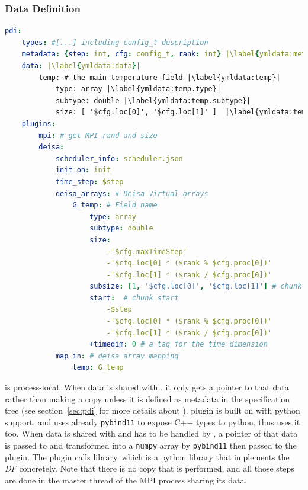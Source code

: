 \subsubsection{Data Definition}\label{sec:datamodel:datadef}
\begin{lstlisting}[float, label=ymldata, language=yaml, caption=Data description in \pdi \deisa YAML file]
pdi:
    types: #[...] including config_t description
    metadata: {step: int, cfg: config_t, rank: int} |\label{ymldata:metadata}|
    data: |\label{ymldata:data}|
        temp: # the main temperature field |\label{ymldata:temp}|
            type: array |\label{ymldata:temp.type}|
            subtype: double |\label{ymldata:temp.subtype}|
            size: [ '$cfg.loc[0]', '$cfg.loc[1]' ]  |\label{ymldata:temp.size}|
    plugins:
        mpi: # get MPI rand and size
        deisa:
            scheduler_info: scheduler.json
            init_on: init 
            time_step: $step 
            deisa_arrays: # Deisa Virtual arrays
                G_temp: # Field name
                    type: array
                    subtype: double
                    size:
                        -'$cfg.maxTimeStep'
                        -'$cfg.loc[0] * ($rank % $cfg.proc[0])'
                        -'$cfg.loc[1] * ($rank / $cfg.proc[0])'
                    subsize: [1, '$cfg.loc[0]', '$cfg.loc[1]'] # chunk size
                    start:  # chunk start
                        -$step
                        -'$cfg.loc[0] * ($rank % $cfg.proc[0])'
                        -'$cfg.loc[1] * ($rank / $cfg.proc[0])'
                    +timedim: 0 # a tag for the time dimension
            map_in: # deisa array mapping
                temp: G_temp    
\end{lstlisting}


\pdi is process-local. When data is shared with \pdi, it only gets a pointer to that data rather than making a copy unless it is defined as metadata in the specification tree (see section~\ref{sec:pdi} for more details about \pdi). 
\deisa plugin is built on \pdi with python support, and \pdi uses already \texttt{pybind11} to expose C++ types to python, thus \deisa uses it too. 
When data is shared with \pdi and has to be handled by \deisa, a pointer of that data is passed to \pdi and transformed into a \texttt{numpy} array by \texttt{pybind11} then passed to the \deisa plugin. 
The plugin calls \pydeisa library, which is a python library that implements the \textit{DF} concretely.
Note that there is no copy that is performed, and all those steps are done in the master thread of the MPI process sharing its data. 

